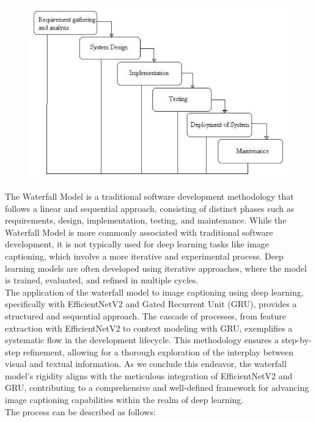 \documentclass[oneside,a4paper,12pt]{report}
\begin{document}
\begin{figure}[H]
\begin{center}
\includegraphics[width=1.0\linewidth]{waterfall}
\caption*{}
\label{Fig:f1}
\end{center}
\end{figure} 
The Waterfall Model is a traditional software development methodology that follows a linear and sequential approach, consisting of distinct phases such as requirements, design, implementation, testing, and maintenance. While the Waterfall Model is more commonly associated with traditional software development, it is not typically used for deep learning tasks like image captioning, which involve a more iterative and experimental process. Deep learning models are often developed using iterative approaches, where the model is trained, evaluated, and refined in multiple cycles.\\
The application of the waterfall model to image captioning using deep learning, specifically with EfficientNetV2 and Gated Recurrent Unit (GRU), provides a structured and sequential approach. The cascade of processes, from feature extraction with EfficientNetV2 to context modeling with GRU, exemplifies a systematic flow in the development lifecycle. This methodology ensures a step-by-step refinement, allowing for a thorough exploration of the interplay between visual and textual information. As we conclude this endeavor, the waterfall model's rigidity aligns with the meticulous integration of EfficientNetV2 and GRU, contributing to a comprehensive and well-defined framework for advancing image captioning capabilities within the realm of deep learning.\\
The process can be described as follows:
\end{document}
